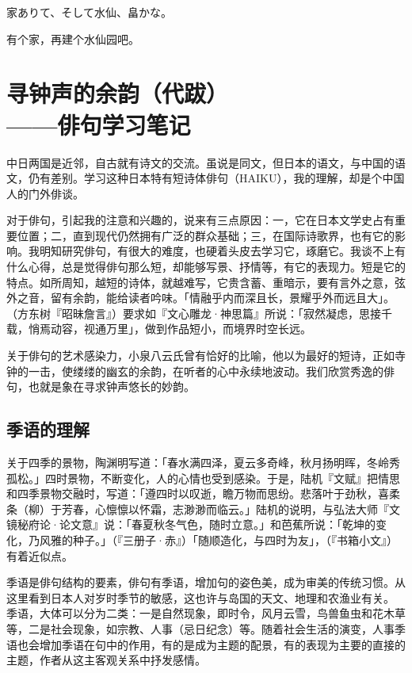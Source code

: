 \begin{haiku}
    {\FH 家ありて、そして水仙、畠かな。}

    {\FK 有个家，再建个水仙园吧。}
\end{haiku}

\chapter[{\FS 寻钟声的余韵（代跋）}]{\FS 寻钟声的余韵（代跋）\\\hspace{2em}——俳句学习笔记}

{\FS
    中日两国是近邻，自古就有诗文的交流。虽说是同文，但日本的语文，与中国的语文，仍有差别。学习这种日本特有短诗体俳句（HAIKU），我的理解，却是个中国人的门外俳谈。

    对于俳句，引起我的注意和兴趣的，说来有三点原因：一，它在日本文学史占有重要位置；二，直到现代仍然拥有广泛的群众基础；三，在国际诗歌界，也有它的影响。我明知研究俳句，有很大的难度，也硬着头皮去学习它，琢磨它。我谈不上有什么心得，总是觉得俳句那么短，却能够写景、抒情等，有它的表现力。短是它的特点。如所周知，越短的诗体，就越难写，它贵含蓄、重暗示，要有言外之意，弦外之音，留有余韵，能给读者吟味。「情融乎内而深且长，景耀乎外而远且大」。（方东树『昭昧詹言』）要求如『文心雕龙·神思篇』所说：「寂然凝虑，思接千载，悄焉动容，视通万里」，做到作品短小，而境界时空长远。

    关于俳句的艺术感染力，小泉八云氏曾有恰好的比喻，他以为最好的短诗，正如寺钟的一击，使缕缕的幽玄的余韵，在听者的心中永续地波动。我们欣赏秀逸的俳句，也就是象在寻求钟声悠长的妙韵。

    \section*{\FS 季语的理解}

    关于四季的景物，陶渊明写道：「春水满四泽，夏云多奇峰，秋月扬明晖，冬岭秀孤松。」四时景物，不断变化，人的心情也受到感染。于是，陆机『文赋』把情思和四季景物交融时，写道：「遵四时以叹逝，瞻万物而思纷。悲落叶于劲秋，喜柔条（柳）于芳春，心懔懔以怀霜，志渺渺而临云。」陆机的说明，与弘法大师『文镜秘府论·论文意』说：「春夏秋冬气色，随时立意。」和芭蕉所说：「乾坤的变化，乃风雅的种子。」（『三册子·赤』）「随顺造化，与四时为友」，（『书箱小文』）有着近似点。

    季语是俳句结构的要素，俳句有季语，增加句的姿色美，成为审美的传统习惯。从这里看到日本人对岁时季节的敏感，这也许与岛国的天文、地理和农渔业有关。
    季语，大体可以分为二类：一是自然现象，即时令，风月云雪，鸟兽鱼虫和花木草等，二是社会现象，如宗教、人事（忌日纪念）等。随着社会生活的演变，人事季语也会增加季语在句中的作用，有的是成为主题的配景，有的表现为主要的直接的主题，作者从这主客观关系中抒发感情。

}
